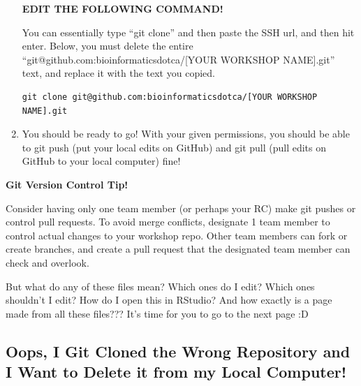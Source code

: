 \documentclass[
]{book}
\newenvironment{redbox}{
  \definecolor{shadecolor}{RGB}{243, 154, 157}
  \color{white}
  \begin{shaded}}
 {\end{shaded}}
\newenvironment{bluebox}{
  \definecolor{shadecolor}{RGB}{172, 210, 237}
  \color{white}
  \begin{shaded}}
 {\end{shaded}}
\theoremstyle{definition}
\theoremstyle{definition}
\theoremstyle{definition}
\theoremstyle{definition}
\theoremstyle{remark}
\begin{document}
\begin{enumerate}
  \begin{redbox}

  \begin{center}
  \textbf{EDIT THE FOLLOWING COMMAND!}

  \end{center}

  You can essentially type ``git clone'' and then paste the SSH url, and then hit enter. Below, you must delete the entire ``{git@}github.com:bioinformaticsdotca/{[}YOUR WORKSHOP NAME{]}.git'' text, and replace it with the text you copied.

  \end{redbox}

\begin{verbatim}
git clone git@github.com:bioinformaticsdotca/[YOUR WORKSHOP NAME].git
\end{verbatim}
\item
  You should be ready to go! With your given permissions, you should be able to git push (put your local edits on GitHub) and git pull (pull edits on GitHub to your local computer) fine!
\end{enumerate}

\begin{bluebox}

\begin{center}
\textbf{Git Version Control Tip!}

\end{center}

Consider having only one team member (or perhaps your RC) make git pushes or control pull requests. To avoid merge conflicts, designate 1 team member to control actual changes to your workshop repo. Other team members can fork or create branches, and create a pull request that the designated team member can check and overlook.

\end{bluebox}

But what do any of these files mean? Which ones do I edit? Which ones shouldn't I edit? How do I open this in RStudio? And how exactly is a page made from all these files??? It's time for you to go to the next page :D

\subsection{Oops, I Git Cloned the Wrong Repository and I Want to Delete it from my Local Computer!}\label{oops-i-git-cloned-the-wrong-repository-and-i-want-to-delete-it-from-my-local-computer}
\end{document}
